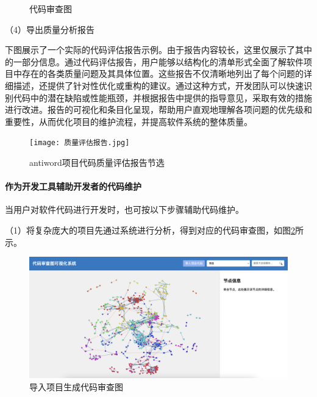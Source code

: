 \begin{figure}[!h]
\begin{minipage}{\textwidth}
    \hspace{2em}
    \end{minipage}
    \vspace{0.2em}
    \caption{代码审查图} %
    \label{1_代码审查图}
\end{figure}

\noindent（4）导出质量分析报告

下图展示了一个实际的代码评估报告示例。由于报告内容较长，这里仅展示了其中的一部分信息。通过代码评估报告，用户能够以结构化的清单形式全面了解软件项目中存在的各类质量问题及其具体位置。这些报告不仅清晰地列出了每个问题的详细描述，还提供了针对性优化或重构的建议。通过这种方式，开发团队可以快速识别代码中的潜在缺陷或性能瓶颈，并根据报告中提供的指导意见，采取有效的措施进行改进。报告的可视化和条目化呈现，帮助用户直观地理解各项问题的优先级和重要性，从而优化项目的维护流程，并提高软件系统的整体质量。

\clearpage

\begin{figure}[h]
\centering
\texttt{[image: 质量评估报告.jpg]}
\caption{antiword项目代码质量评估报告节选}
\end{figure}


\paragraph{作为开发工具辅助开发者的代码维护} 当用户对软件代码进行开发时，也可按以下步骤辅助代码维护。

\noindent（1）将复杂庞大的项目先通过系统进行分析，得到对应的代码审查图，如图\ref{1_导入项目生成代码审查图}所示。

\begin{figure}[h]
\centering
\includegraphics[width = 1.0\textwidth]{figures/开发1.jpg}
\caption{导入项目生成代码审查图}
\label{1_导入项目生成代码审查图}
\end{figure}

